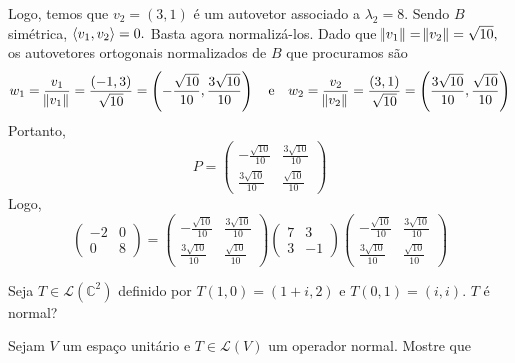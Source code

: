 \documentclass[11pt,a4paper]{article}
\begin{document}
{{Logo, temos que $v_2 = (3,1)$ é um autovetor associado a $\lambda_2 = 8.$ 
Sendo $B$ simétrica, $\left\langle v_1, v_2 \right\rangle = 0.$ Basta agora normalizá-los. Dado que $\norm{v_1} = \norm{v_2} = \sqrt{10},$ os autovetores ortogonais normalizados de $B$ que procuramos são
\[
w_1 = \frac{v_1}{\norm{v_1}} = \frac{(-1,3)}{\sqrt{10}} = \left(-\frac{\sqrt{10}}{10}, \frac{3 \sqrt{10}}{10} \right) \quad \mbox{e} \quad w_2 = \frac{v_2}{\norm{v_2}} = \frac{(3,1)}{\sqrt{10}} = \left(\frac{3\sqrt{10}}{10}, \frac{ \sqrt{10}}{10} \right) 
\]
Portanto, 
\[
P = \begin{pmatrix}
-\frac{\sqrt{10}}{10} & \frac{3\sqrt{10}}{10} \\
\frac{3 \sqrt{10}}{10} & \frac{\sqrt{10}}{10} 
\end{pmatrix}
\]
Logo,
\[
 \begin{pmatrix}
-2 & 0 \\
0 & 8
\end{pmatrix} = \begin{pmatrix}
-\frac{\sqrt{10}}{10} & \frac{3\sqrt{10}}{10} \\
\frac{3 \sqrt{10}}{10} & \frac{\sqrt{10}}{10} 
\end{pmatrix}
 \begin{pmatrix}
7 & 3 \\
3 & -1
\end{pmatrix}
\begin{pmatrix}
-\frac{\sqrt{10}}{10} & \frac{3\sqrt{10}}{10} \\
\frac{3 \sqrt{10}}{10} & \frac{\sqrt{10}}{10}  
\end{pmatrix}
\]
} 
}

 Seja $T \in \mathcal{L}(\mathbb{C}^2)$ definido por $T(1, 0) = (1 + i, 2)$ e $T(0, 1) = (i, i).$ $T$ é normal?


 Sejam $V$ um espaço unitário e $T \in \mathcal{L}(V)$ um operador normal. Mostre que
\end{document}
